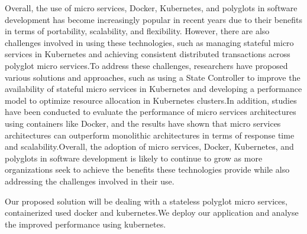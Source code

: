 Overall, the use of micro services, Docker, Kubernetes, and polyglots in software development has become increasingly popular in recent years due to their benefits in terms of portability, scalability, and flexibility. However, there are also challenges involved in using these technologies, such as managing stateful micro services in Kubernetes and achieving consistent distributed transactions across polyglot micro services.To address these challenges, researchers have proposed various solutions and approaches, such as using a State Controller to improve the availability of stateful micro services in Kubernetes and developing a performance model to optimize resource allocation in Kubernetes clusters.In addition, studies have been conducted to evaluate the performance of micro services architectures using containers like Docker, and the results have shown that micro services architectures can outperform monolithic architectures in terms of response time and scalability.Overall, the adoption of micro services, Docker, Kubernetes, and polyglots in software development is likely to continue to grow as more organizations seek to achieve the benefits these technologies provide while also addressing the challenges involved in their use.

Our proposed solution will be dealing with a stateless polyglot micro services, containerized used docker and kubernetes.We deploy our application and analyse the improved performance using kubernetes.

\begin{table}[h]
\end{table}























